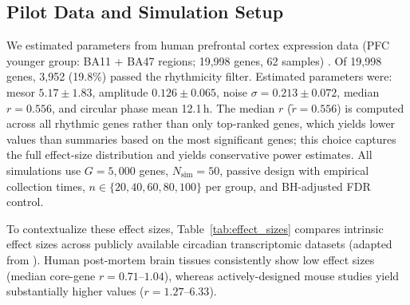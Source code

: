 \documentclass{article}
\begin{document}
\subsection{Pilot Data and Simulation Setup}

We estimated parameters from human prefrontal cortex expression data (PFC younger group: BA11 + BA47 regions; 19,998 genes, 62 samples) \cite{chen2016aging}. Of 19,998 genes, 3,952 (19.8\%) passed the rhythmicity filter. Estimated parameters were: mesor $5.17 \pm 1.83$, amplitude $0.126 \pm 0.065$, noise $\sigma = 0.213 \pm 0.072$, median $r = 0.556$, and circular phase mean 12.1\,h. The median $r$ ($\tilde{r} = 0.556$) is computed across all rhythmic genes rather than only top-ranked genes, which yields lower values than summaries based on the most significant genes; this choice captures the full effect-size distribution and yields conservative power estimates. All simulations use $G = 5{,}000$ genes, $N_{\text{sim}} = 50$, passive design with empirical collection times, $n \in \{20, 40, 60, 80, 100\}$ per group, and BH-adjusted FDR control.

To contextualize these effect sizes, Table~\ref{tab:effect_sizes} compares intrinsic effect sizes across publicly available circadian transcriptomic datasets (adapted from \cite{zong2023circapower}). Human post-mortem brain tissues consistently show low effect sizes (median core-gene $r = 0.71$--$1.04$), whereas actively-designed mouse studies yield substantially higher values ($r = 1.27$--$6.33$).
\end{document}
